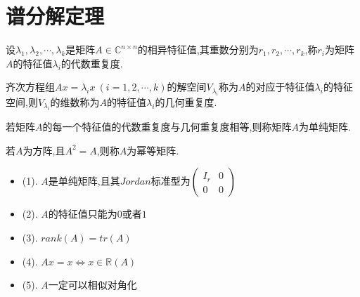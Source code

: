 \section{谱分解定理}

\begin{definition}[代数重复度]
	设$\lambda_{1},\lambda_{2},\cdots,\lambda_{k}$是矩阵$A\in \mathbb{C}^{n\times n}$的相异特征值,其重数分别为$r_{1},r_{2},\cdots,r_{k}$,称$r_{i}$为矩阵$A$的特征值$\lambda_{i}$的代数重复度.
\end{definition}
\begin{definition}[几何重复度]
	齐次方程组$Ax=\lambda_{i}x\ (i=1,2,\cdots,k)$的解空间$V_{\lambda_{i}}$称为$A$的对应于特征值$\lambda_{i}$的特征空间,则$V_{\lambda_{i}}$的维数称为$A$的特征值$\lambda_{i}$的几何重复度.
\end{definition}
\begin{definition}[单纯矩阵]
	若矩阵$A$的每一个特征值的代数重复度与几何重复度相等,则称矩阵$A$为单纯矩阵.
\end{definition}
\begin{definition}[幂等矩阵]
	若$A$为方阵,且$A^2=A$,则称$A$为幂等矩阵.
\end{definition}
\begin{property}[幂等矩阵$A$性质]
	\begin{itemize}
		\item (1). $A$是单纯矩阵,且其$Jordan$标准型为$\left(\begin{matrix}
			I_{r}&0\\0&0
		\end{matrix} \right) $
		\item (2). $A$的特征值只能为$0$或者$1$
		\item (3). $rank(A)=tr(A)$
		\item (4). $Ax=x\Leftrightarrow x\in\mathbb{R}(A)$
		\item (5). $A$一定可以相似对角化
	\end{itemize}
\end{property}
